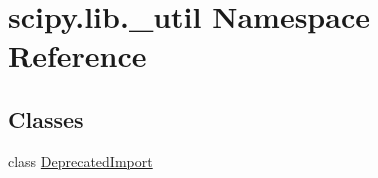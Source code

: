 \hypertarget{namespacescipy_1_1lib_1_1__util}{}\section{scipy.\+lib.\+\_\+util Namespace Reference}
\label{namespacescipy_1_1lib_1_1__util}
\subsection*{Classes}
\begin{DoxyCompactItemize}
\item 
class \hyperlink{classscipy_1_1lib_1_1__util_1_1DeprecatedImport}{Deprecated\+Import}
\end{DoxyCompactItemize}
